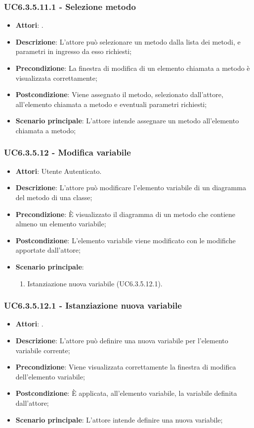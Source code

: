\subsubsection{UC6.3.5.11.1 - Selezione metodo} 
\label{sssec:UC6.3.5.11.1} 
\begin{itemize} 
\item \textbf{Attori}: .
\item \textbf{Descrizione}: L'attore può selezionare un metodo dalla lista dei metodi, e parametri in ingresso da esso richiesti;
\item \textbf{Precondizione}: La finestra di modifica di un elemento chiamata a metodo è visualizzata correttamente;
\item \textbf{Postcondizione}: Viene assegnato il metodo, selezionato dall'attore, all'elemento chiamata a metodo e eventuali parametri richiesti;
\item \textbf{Scenario principale}: L'attore intende assegnare un metodo all'elemento chiamata a metodo;\end{itemize} 
\subsubsection{UC6.3.5.12 - Modifica variabile} 
\label{sssec:UC6.3.5.12} 
\begin{itemize} 
\item \textbf{Attori}: Utente Autenticato.
\item \textbf{Descrizione}: L'attore può modificare l'elemento variabile di un diagramma del metodo di una classe;
\item \textbf{Precondizione}: È visualizzato il diagramma di un metodo che contiene almeno un elemento variabile;
\item \textbf{Postcondizione}: L'elemento variabile viene modificato con le modifiche apportate dall'attore;
\item \textbf{Scenario principale}: \begin{enumerate}\item Istanziazione nuova variabile (UC6.3.5.12.1). 
 \end{enumerate}
\end{itemize} 
\subsubsection{UC6.3.5.12.1 - Istanziazione nuova variabile} 
\label{sssec:UC6.3.5.12.1} 
\begin{itemize} 
\item \textbf{Attori}: .
\item \textbf{Descrizione}: L'attore può definire una nuova variabile per l'elemento variabile corrente;
\item \textbf{Precondizione}: Viene visualizzata correttamente la finestra di modifica dell'elemento variabile;
\item \textbf{Postcondizione}: È applicata, all'elemento variabile, la variabile definita dall'attore;
\item \textbf{Scenario principale}: L'attore intende definire una nuova variabile;\end{itemize} 
